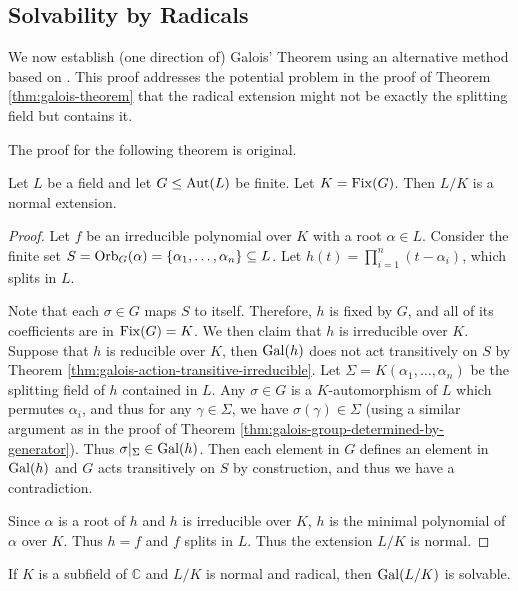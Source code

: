 \subsection{Solvability by Radicals} \label{sec:radical-alter}

We now establish (one direction of) Galois' Theorem using an alternative method based on \cite[Chapter~15]{Stewart}. This proof addresses the potential problem in the proof of Theorem \ref{thm:galois-theorem} that the radical extension might not be exactly the splitting field but contains it.  

The proof for the following theorem is original. 
\begin{theorem} \label{thm:fix-extension-normal}
	Let $L$ be a field and let $G \le \operatorname{Aut}(L)$ be finite. Let $K = \operatorname{Fix}(G)$. Then $L/K$ is a normal extension.
\end{theorem}

\begin{proof}
	
	Let $f$ be an irreducible polynomial over $K$ with a root $\alpha \in L$. Consider the finite set $S = \operatorname{Orb}_G(\alpha) = \{ \alpha_1, \ldots, \alpha_n\} \subseteq L$. Let $h(t) = \prod_{i = 1} ^n (t - \alpha_i)$, which splits in $L$.
	
	Note that each $\sigma \in G$ maps $S$ to itself. Therefore, $h$ is fixed by $G$, and all of its coefficients are in $\operatorname{Fix}(G) = K$. We then claim that $h$ is irreducible over $K$. Suppose that $h$ is reducible over $K$, then $\operatorname{Gal}(h)$ does not act transitively on $S$ by Theorem \ref{thm:galois-action-transitive-irreducible}. Let $\Sigma = K(\alpha_1, \dots, \alpha_n)$ be the splitting field of $h$ contained in $L$.  Any $\sigma \in G$ is a $K$-automorphism of $L$ which permutes $\alpha_i$, and thus for any $\gamma \in \Sigma$, we have $\sigma(\gamma) \in \Sigma$ (using a similar argument as in the proof of Theorem \ref{thm:galois-group-determined-by-generator}). Thus $\sigma | _ \Sigma \in \operatorname{Gal}(h)$. 
	Then each element in $G$ defines an element in $\operatorname{Gal}(h)$ and $G$ acts transitively on $S$ by construction, and thus we have a contradiction. 
	
	Since $\alpha$ is a root of $h$ and $h$ is irreducible over $K$, $h$ is the minimal polynomial of $\alpha$ over $K$. Thus $h = f$ and $f$ splits in $L$. Thus the extension $L/K$ is normal. 
\end{proof}


\begin{theorem} \label{thm:radical-3}
	If $K$ is a subfield of $\mathbb{C}$ and $L / K$ is normal and radical, then $\operatorname{Gal}(L / K)$ is solvable.
\end{theorem}

